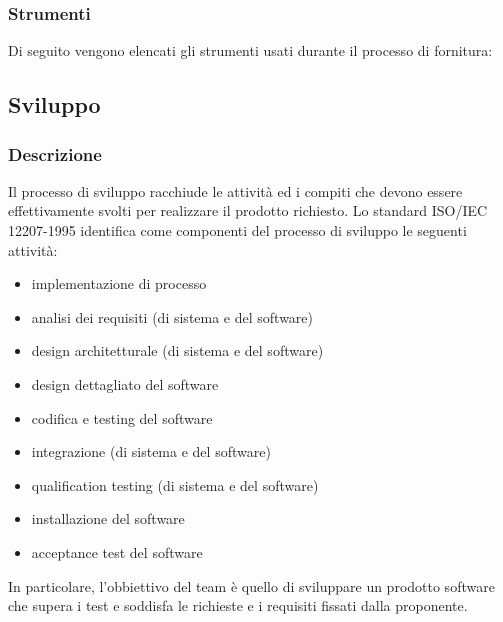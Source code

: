         \subsubsection{Strumenti}
        Di seguito vengono elencati gli strumenti usati durante il processo di fornitura:
        
    \subsection{Sviluppo}
        \subsubsection{Descrizione}
        Il processo di sviluppo racchiude le attività ed i compiti che devono essere effettivamente svolti per realizzare il prodotto richiesto.
       Lo standard ISO/IEC 12207-1995 identifica come componenti del processo di sviluppo le seguenti attività:
        \begin{itemize}
            \item{implementazione di processo}
            \item{analisi dei requisiti (di sistema e del software)}
            \item{design architetturale (di sistema e del software)}
            \item{design dettagliato del software}
            \item{codifica e testing del software}
            \item{integrazione (di sistema e del software)}
            \item{qualification testing (di sistema e del software)}
            \item{installazione del software}
            \item{acceptance test del software}
        \end{itemize}
        In particolare, l'obbiettivo del team è quello di sviluppare un prodotto software che supera i test e soddisfa le richieste e i requisiti fissati dalla proponente.
            
